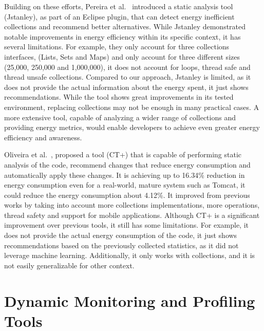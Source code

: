 Building on these efforts, Pereira et al.~\cite{10.1145/3238147.3240473} introduced a static analysis tool (Jstanley), as part of an Eclipse plugin, that can detect energy inefficient collections and recommend better alternatives. While Jstanley demonstrated notable improvements in energy efficiency within its specific context, it has several limitations.
For example, they only account for three collections interfaces, (Lists, Sets and Maps) and only account for three different sizes (25,000, 250,000 and 1,000,000), it does not account for loops, thread safe and thread unsafe collections. Compared to our approach, Jstanley is limited, as it does not provide the actual information about the energy spent, it just shows recommendations. While the tool shows great improvements in its tested environment, replacing collections may not be enough in many practical cases. A more extensive tool, capable of analyzing a wider range of collections and providing energy metrics, would enable developers to achieve even greater energy efficiency and awareness.

Oliveira et al.~\cite{8816747}, proposed a tool (CT+) that is capable of performing static analysis of the code, recommend changes that reduce energy consumption and automatically apply these changes. It is achieving up to 16.34\% reduction in energy consumption even for a real-world, mature system such as Tomcat, it could reduce the energy consumption about 4.12\%. It improved from previous works by taking into account more collections implementations, more operations, thread safety and support for mobile applications. Although CT+ is a significant improvement over previous tools, it still has some limitations. For example, it does not provide the actual energy consumption of the code, it just shows recommendations based on the previously collected statistics, as it did not leverage machine learning. Additionally, it only works with collections, and it is not easily generalizable for other context. 

\section{Dynamic Monitoring and Profiling Tools}

